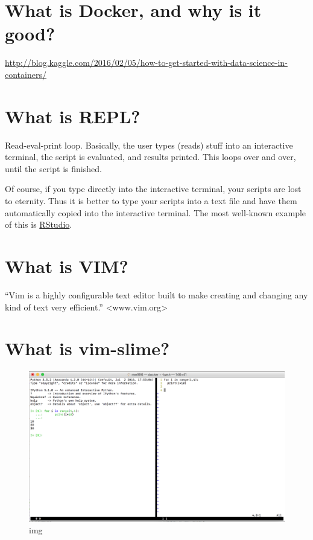 \documentclass[]{book}
\theoremstyle{definition}
\theoremstyle{definition}
\theoremstyle{remark}
\begin{document}
\section{What is Docker, and why is it
good?}\label{what-is-docker-and-why-is-it-good}

\url{http://blog.kaggle.com/2016/02/05/how-to-get-started-with-data-science-in-containers/}

\section{What is REPL?}\label{what-is-repl}

Read-eval-print loop. Basically, the user types (reads) stuff into an
interactive terminal, the script is evaluated, and results printed. This
loops over and over, until the script is finished.

Of course, if you type directly into the interactive terminal, your
scripts are lost to eternity. Thus it is better to type your scripts
into a text file and have them automatically copied into the interactive
terminal. The most well-known example of this is
\href{http://www.rstudio.com}{RStudio}.

\section{What is VIM?}\label{what-is-vim}

``Vim is a highly configurable text editor built to make creating and
changing any kind of text very efficient.''
\textless{}www.vim.org\textgreater{}

\section{What is vim-slime?}\label{what-is-vim-slime}

\begin{figure}[htbp]
\centering
\includegraphics{vim-python.png}
\caption{img}
\end{figure}
\end{document}
